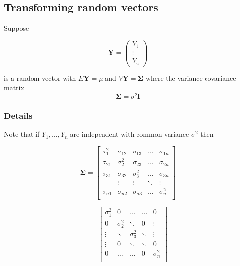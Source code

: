\documentclass[12pt,a4paper]{article}
\theoremstyle{regla}
\theoremstyle{remark}
\theoremstyle{definition}
\theoremstyle{nonumberbreak}
\begin{document}
\subsection{Transforming random vectors}
\begin{fbox}
\begin{minipage}{0.97\textwidth}
Suppose 

\[\mathbf{Y}=
\left(
\begin{array}{c}
Y_1\\
\vdots \\
Y_n
\end{array} \right)\]

is a random vector with $E \mathbf{Y} = \mu$ and $V \mathbf{Y} = \boldsymbol{\Sigma} $ where the variance-covariance matrix 
$$ \boldsymbol{\Sigma} = \sigma^2 \mathbf{I} $$
\end{minipage}
\end{fbox}
\subsubsection{Details}
Note that if $Y_1, \ldots, Y_n$ are independent with common variance $\sigma^2$ then

\[
\boldsymbol{\Sigma}=
\left[
\begin{array}{ccccc}
\sigma_{1}^{2} & \sigma_{12} & \sigma_{13} & \ldots & \sigma_{1n} \\
\sigma_{21} & \sigma_2^{2} & \sigma_{23} & \ldots & \sigma_{2n} \\
\sigma_{31} &\sigma_{32}  &\sigma_3^{2}  & \ldots & \sigma_{3n}\\
\vdots & \vdots & \vdots & \ddots & \vdots \\
\sigma_{n1} & \sigma_{n2} & \sigma_{n3} & \ldots & \sigma_n^{2}\\ 
\end{array} \right]
\]




\[
 =
\left[
\begin{array}{ccccc}
\sigma_{1}^{2} & 0 & \ldots & \ldots & 0 \\
 0 & \sigma_2^{2} & \ddots & 0  & \vdots \\
 \vdots & \ddots  &\sigma_3^{2}  & \ddots & \vdots \\
\vdots & 0 & \ddots & \ddots & 0 \\
0 & \ldots & \ldots & 0 & \sigma_n^{2}\\ 
\end{array} \right]\]
\end{document}
